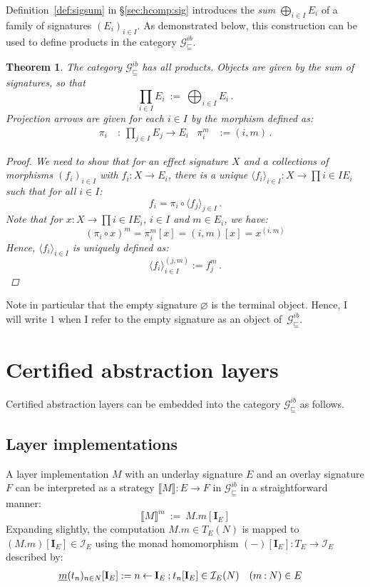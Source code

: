 \documentclass[11pt,oneside,draft]{book}
\newtheorem{theorem}{Theorem}[chapter]
\theoremstyle{definition}
\newcommand{\gcat}{\mathcal{G}_{\sqsubseteq}}
\newcommand{\ul}[1]{%
  \underline{\smash{#1}}
}
\begin{document}
Definition~\ref{def:sigsum} in \S\ref{sec:hcomp:sig}
introduces the \emph{sum} $\bigoplus_{i \in I} E_i$
of a family of signatures $(E_i)_{i \in I}$.
As demonstrated below,
this construction can be used to define
products in the category $\gcat^{ib}$.

\begin{theorem}
The category $\gcat^{ib}$ has all products.
Objects are given by the
sum of signatures, so that
\[
  \prod_{i \in I} E_i \: := \: \bigoplus_{i \in I} E_i
  \,.
\]
Projection arrows are
given for each $i \in I$ by
the morphism defined as:
\begin{align*}
  \pi_i \: &: \: \prod_{j \in I} E_j \rightarrow E_i
  &
  \pi_i^m &:= (i, m) \,.
\end{align*}
\begin{proof}
We need to show that for an effect signature $X$
and a collections of morphisms $(f_i)_{i \in I}$ with
$f_i : X \rightarrow E_i$,
there is a unique
$\langle f_i \rangle_{i \in I} : X \rightarrow \prod{i \in I} E_i$
such that for all $i \in I$:
\[
    f_i = \pi_i \circ \langle f_j \rangle_{j \in I} \,.
\]
Note that for $x : X \rightarrow \prod{i \in I} E_i$,
$i \in I$ and $m \in E_i$, we have:
\[
    (\pi_i \circ x)^m = \pi_i^m[x] = (i, m) [x] = x^{(i, m)}
\]
Hence, $\langle f_i \rangle_{i \in I}$ is uniquely defined as:
\[
    \langle f_i \rangle_{i \in I}^{(j, m)} := f_j^m \,.
\]
\end{proof}
\end{theorem}

Note in particular that the empty signature $\varnothing$
is the terminal object.
Hence,
I will write $1$ when I refer to the empty signature
as an object of~$\gcat^{ib}$.


\section{Certified abstraction layers} \label{sec:intspec:cal} %

Certified abstraction layers can be embedded into
the category $\gcat^{ib}$ as follows.

\subsection{Layer implementations} %

A layer implementation $M$ with
an underlay signature $E$ and
an overlay signature $F$
can be interpreted as a strategy
$\llbracket M \rrbracket : E \rightarrow F$
in $\gcat^{ib}$
in a straightforward manner:
\[
  \llbracket M \rrbracket^m \: := \: M.m[\mathbf{I}_E]
\]
Expanding slightly,
the computation $M.m \in T_E(N)$
is mapped to $(M.m)[\mathbf{I}_E] \in \mathcal{I}_E$
using the monad homomorphism
$(-)[\mathbf{I}_E] : T_E \rightarrow \mathcal{I}_E$
described by:
\begin{align*}
  \ul{m}(t_n)_{n \in N}[\mathbf{I}_E] &:=
    n \mathbin\leftarrow \mathbf{I}_E \mathbin; t_n[\mathbf{I}_E]
    \in \mathcal{I}_E(N) &
    (m \mathbin: N) &\in E
\end{align*}
\end{document}
